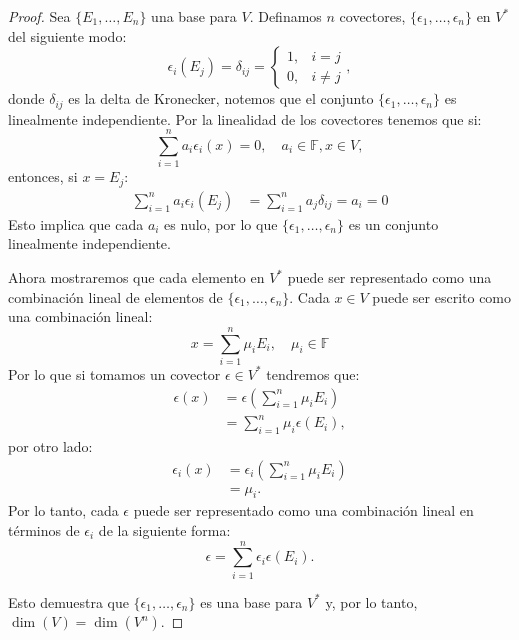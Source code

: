 \begin{proof}
	Sea $\{E_1, \dots, E_n\}$ una base para $V$. Definamos $n$ covectores, $\{\epsilon_1, \dots, \epsilon_n\}$ en $V^{*}$ del siguiente modo:
	\[
		\epsilon_i(E_j) = \delta_{ij} = \begin{cases}
			1, & i = j    \\
			0, & i \neq j
		\end{cases},
	\]
	donde $\delta_{ij}$ es la delta de Kronecker, notemos que el conjunto $\{\epsilon_1, \dots, \epsilon_n\}$ es linealmente independiente. Por la linealidad de los covectores tenemos que si:
	\[
		\sum_{i=1}^{n} a_i \epsilon_i(x) = 0, \quad a_{i} \in \mathbb{F}, x \in V,
	\]
	entonces, si $x = E_j$:
	\begin{align*}
		\sum_{i=1}^n a_i \epsilon_i (E_j) & = \sum_{i=1}^n a_j \delta_{ij} = a_i = 0
	\end{align*}
	Esto implica que cada $a_i$ es nulo, por lo que $\{\epsilon_1, \dots, \epsilon_n\}$ es un conjunto linealmente independiente.

	Ahora mostraremos que cada elemento en $V^{*}$ puede ser representado como una combinación lineal de elementos de $\{\epsilon_1, \dots, \epsilon_n\}$. Cada $x \in V$ puede ser escrito como una combinación lineal:
	\[
		x = \sum_{i=1}^{n} \mu_{i} E_i, \quad \mu_i \in \mathbb{F}
	\]
	Por lo que si tomamos un covector $\epsilon \in V^{*}$ tendremos que:
	\begin{align*}
		\epsilon(x) & = \epsilon
		\left (\sum_{i=1}^{n} \mu_i E_i \right)                          \\
		            & = \sum_{i=1}^{n} \mu_i \epsilon \left(E_i \right),
	\end{align*}
	por otro lado:
	\begin{align*}
		\epsilon_i(x) & = \epsilon_i\left(\sum_{i=1}^{n} \mu_i E_i\right) \\
		              & = \mu_i.
	\end{align*}
	Por lo tanto, cada $\epsilon$ puede ser representado como una combinación lineal en términos de $\epsilon_i$ de la siguiente forma:
	\[
		\epsilon = \sum_{i=1}^{n} \epsilon_i \epsilon(E_i).
	\]

	Esto demuestra que $\{\epsilon_1, \dots, \epsilon_n\}$ es una base para $V^{*}$ y, por lo tanto, $\dim(V) = \dim(V^{n})$.
\end{proof}

